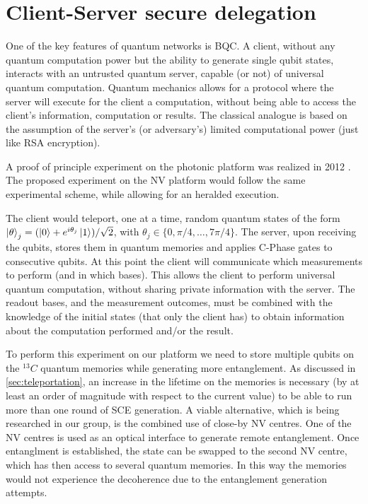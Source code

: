 \documentclass[a4paper]{article}
\begin{document}
\section{Client-Server secure delegation}
\label{sec:delegation}

One of the key features of quantum networks is \ac{BQC}. A client, without any quantum computation power but the ability to generate single qubit states, interacts with an untrusted quantum server, capable (or not) of universal quantum computation. Quantum mechanics allows for a protocol where the server will execute for the client a computation, without being able to access the client's information, computation or results. The classical analogue is based on the assumption of the server's (or adversary's) limited computational power (just like RSA encryption).

A proof of principle experiment on the photonic platform was realized in 2012 \cite{Barz2012}. The proposed experiment on the NV platform would follow the same experimental scheme, while allowing for an heralded execution.

The client would teleport, one at a time, random quantum states of the form $\ket\theta_j = (\ket 0 + e^{i \theta_j}\ket 1)/\sqrt 2$, with $\theta_j \in \lbrace0, \pi/4,\ldots,7\pi/4\rbrace$. The server, upon receiving the qubits, stores them in quantum memories and applies C-Phase gates to consecutive qubits.
At this point the client will communicate which measurements to perform (and in which bases). This allows the client to perform universal quantum computation, without sharing private information with the server. The readout bases, and the measurement outcomes, must be combined with the knowledge of the initial states (that only the client has) to obtain information about the computation performed and/or the result.

To perform this experiment on our platform we need to store multiple qubits on the ${}^{13}C$ quantum memories while generating more entanglement. As discussed in \autoref{sec:teleportation}, an increase in the lifetime on the memories is necessary (by at least an order of magnitude with respect to the current value) to be able to run more than one round of \ac{SCE} generation. 
A viable alternative, which is being researched in our group, is the combined use of close-by NV centres. One of the NV centres is used as an optical interface to generate remote entanglement. Once entanglment is established, the state can be swapped to the second NV centre, which has then access to several quantum memories. In this way the memories would not experience the decoherence due to the entanglement generation attempts.
\end{document}
